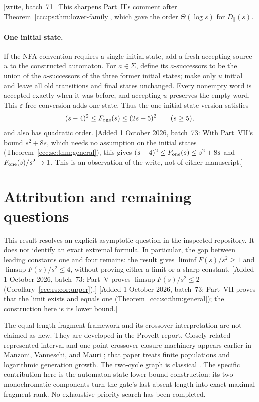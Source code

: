 \documentclass[11pt,letterpaper]{article}
\theoremstyle{definition}
\theoremstyle{remark}
\newcommand{\eps}{\varepsilon}
\newcommand{\wsevone}{\textup{[write, batch~71]}}
\newcommand{\waddsevthree}[1]{\textup{[}Added 1 October 2026, batch~73: #1\textup{]}}
\begin{document}
\wsevone\ This sharpens Part~II's comment after
Theorem~\ref{ccc:ps:thm:lower-family}, which gave the order $\Theta(\log s)$
for $D_\parallel(s)$.

\paragraph{One initial state.}
If the NFA convention requires a single initial state, add a fresh accepting
source $u$ to the constructed automaton. For $a\in\Sigma$, define its
$a$-successors to be the union of the $a$-successors of the three former
initial states; make only $u$ initial and leave all old transitions and final
states unchanged. Every nonempty word is accepted exactly when it was before,
and accepting $u$ preserves the empty word. This $\eps$-free conversion adds
one state. Thus the one-initial-state version satisfies
\[
(s-4)^2\le F_{\rm one}(s)\le(2s+5)^2\qquad(s\ge5),
\]
and also has quadratic order.
\waddsevthree{With Part~VII's bound $s^2+8s$, which needs no assumption on the
initial states (Theorem~\ref{ccc:sc:thm:general}), this gives
$(s-4)^2\le F_{\rm one}(s)\le s^2+8s$ and $F_{\rm one}(s)/s^2\to1$. This is
an observation of the write, not of either manuscript.}

\section{Attribution and remaining questions}\label{ccc:qr:sec:scope}

This result resolves an explicit asymptotic question in the inspected
repository. It does not identify an exact extremal formula. In particular,
the gap between leading constants one and four remains: the result gives
$\liminf F(s)/s^2\ge1$ and $\limsup F(s)/s^2\le4$, without proving either a
limit or a sharp constant.
\waddsevthree{Part~V proves $\limsup F(s)/s^2\le2$
(Corollary~\ref{ccc:rs:cor:upper}).}
\waddsevthree{Part~VII proves that the limit exists and equals one
(Theorem~\ref{ccc:sc:thm:general}); the construction here is its lower
bound.}

The equal-length fragment framework and its crossover interpretation are not
claimed as new. They are developed in the ProveIt report. Closely related
represented-interval and one-point-crossover closure machinery appears
earlier in Manzoni, Vanneschi, and Mauri \cite[Definition~5.2, Theorem~5.3,
and Section~5.1]{Manzoni}; that paper treats finite populations and
logarithmic generation growth. The two-cycle graph is classical
\cite{Wielandt,Neufeld}. The specific contribution here is the
automaton-state lower-bound construction: its two monochromatic components
turn the gate's last absent length into exact maximal fragment rank. No
exhaustive priority search has been completed.
\end{document}
